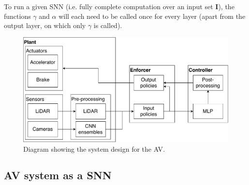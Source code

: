 To run a given \ac{SNN} (i.e. fully complete computation over an input set $\mathbf{I}$), the functions $\gamma$ and $\alpha$ will each need to be called once for every layer (apart from the output layer, on which only $\gamma$ is called).


\begin{figure}[b]
	\centering
	\includegraphics[width=\linewidth]{Content/fig/AV-sys.pdf}
	\caption{Diagram showing the system design for the \ac{AV}. \label{fig:avsys}}
\end{figure}

\subsection{\ac{AV} system as a \ac{SNN}}

